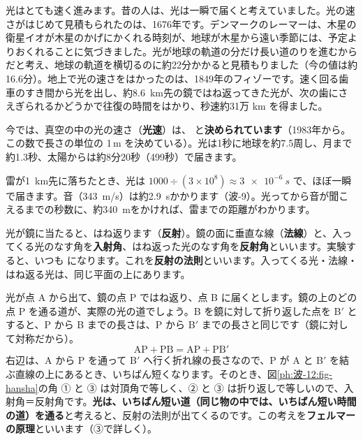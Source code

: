 光はとても速く進みます。昔の人は、光は一瞬で届くと考えていました。光の速さがはじめて見積もられたのは、1676年です。デンマークのレーマーは、木星の衛星イオが木星のかげにかくれる時刻が、地球が木星から遠い季節には、予定よりおくれることに気づきました。光が地球の軌道の分だけ長い道のりを進むからだと考え、地球の軌道を横切るのに約22分かかると見積もりました（今の値は約16.6分）。地上で光の速さをはかったのは、1849年のフィゾーです。速く回る歯車のすき間から光を出し、約\qty{8.6}{km}先の鏡ではね返ってきた光が、次の歯にさえぎられるかどうかで往復の時間をはかり、秒速約31万 km を得ました。

今では、真空の中の光の速さ（\textbf{光速}）は、
と\textbf{決められています}（1983年から。この数で長さの単位の 1\,m を決めている）。光は1秒に地球を約7.5周し、月まで約1.3秒、太陽からは約8分20秒（499秒）で届きます。

\begin{phmijika}[雷の光と音]
雷が\qty{1}{km}先に落ちたとき、光は $1000\div(3\times10^8)\approx\qty{3e-6}{s}$ で、ほぼ一瞬で届きます。音（\qty{343}{m/s}）は約\qty{2.9}{s}かかります（波-9）。光ってから音が聞こえるまでの秒数に、約\qty{340}{m}をかければ、雷までの距離がわかります。
\end{phmijika}

\label{ph:波-12:sec2}
\label{ph:波-12:hansha}光が鏡に当たると、はね返ります（\textbf{反射}）。鏡の面に垂直な線（\textbf{法線}）と、入ってくる光のなす角を\textbf{入射角}、はね返った光のなす角を\textbf{反射角}といいます。実験すると、いつも
になります。これを\textbf{反射の法則}といいます。入ってくる光・法線・はね返る光は、同じ平面の上にあります。

光が点 A から出て、鏡の点 P ではね返り、点 B に届くとします。鏡の上のどの点 P を通る道が、実際の光の道でしょう。B を鏡に対して折り返した点を B$'$ とすると、P から B までの長さは、P から B$'$ までの長さと同じです（鏡に対して対称だから）。
\[\text{AP}+\text{PB}=\text{AP}+\text{PB}'\]
右辺は、A から P を通って B$'$ へ行く折れ線の長さなので、P が A と B$'$ を結ぶ直線の上にあるとき、いちばん短くなります。そのとき、図\ref{ph:波-12:fig-hansha}の角 ① と ③ は対頂角で等しく、② と ③ は折り返しで等しいので、入射角＝反射角です。\textbf{光は、いちばん短い道（同じ物の中では、いちばん短い時間の道）を通る}と考えると、反射の法則が出てくるのです。この考えを\textbf{フェルマーの原理}といいます（③で詳しく）。

